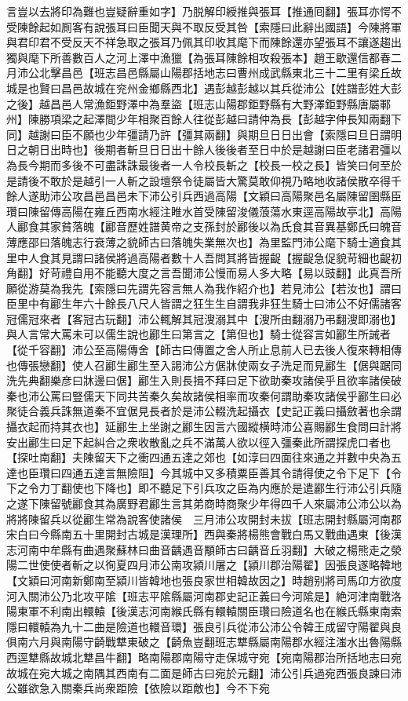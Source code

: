 言豈以去將印為難也豈疑辭重如字】乃脱解印綬推與張耳【推通囘翻】張耳亦愕不受陳餘起如厠客有說張耳曰臣聞天與不取反受其咎【索隱曰此辭出國語】今陳將軍與君印君不受反天不祥急取之張耳乃佩其印收其麾下而陳餘還亦望張耳不讓遂趨出獨與麾下所善數百人之河上澤中漁獵【為張耳陳餘相攻殺張本】趙王歇還信都春二月沛公北擊昌邑【班志昌邑縣屬山陽郡括地志曰曹州成武縣東北三十二里有梁丘故城是也賢曰昌邑故城在兖州金鄉縣西北】遇彭越彭越以其兵從沛公【姓譜彭姓大彭之後】越昌邑人常漁鉅野澤中為羣盜【班志山陽郡鉅野縣有大野澤鉅野縣唐屬鄆州】陳勝項梁之起澤間少年相聚百餘人往從彭越曰請仲為長【彭越字仲長知兩翻下同】越謝曰臣不願也少年彊請乃許【彊其兩翻】與期旦日日出會【索隱曰旦日謂明日之朝日出時也】後期者斬旦日日出十餘人後後者至日中於是越謝曰臣老諸君彊以為長今期而多後不可盡誅誅最後者一人令校長斬之【校長一校之長】皆笑曰何至於是請後不敢於是越引一人斬之設壇祭令徒屬皆大驚莫敢仰視乃略地收諸侯散卒得千餘人遂助沛公攻昌邑昌邑未下沛公引兵西過高陽【文穎曰高陽聚邑名屬陳留圉縣臣瓚曰陳留傳高陽在雍丘西南水經注睢水首受陳留浚儀蒗蕩水東逕高陽故亭北】高陽人酈食其家貧落魄【酈音歷姓譜黄帝之支孫封於酈後以為氏食其音異基鄭氏曰魄音薄應邵曰落魄志行衰薄之貌師古曰落魄失業無次也】為里監門沛公麾下騎士適食其里中人食其見謂曰諸侯將過高陽者數十人吾問其將皆握齪【握齪急促貌苛細也齪初角翻】好苛禮自用不能聽大度之言吾聞沛公慢而易人多大略【易以豉翻】此真吾所願從游莫為我先【索隱曰先謂先容言無人為我作紹介也】若見沛公【若汝也】謂曰臣里中有酈生年六十餘長八尺人皆謂之狂生生自謂我非狂生騎士曰沛公不好儒諸客冠儒冠來者【客冠古玩翻】沛公輒解其冠溲溺其中【溲所由翻溺乃弔翻溲即溺也】與人言常大罵未可以儒生說也酈生曰第言之【第但也】騎士從容言如酈生所誡者【從千容翻】沛公至高陽傳舍【師古曰傳置之舍人所止息前人已去後人復來轉相傳也傳張戀翻】使人召酈生酈生至入謁沛公方倨牀使兩女子洗足而見酈生【倨與踞同洗先典翻樂彦曰牀邊曰倨】酈生入則長揖不拜曰足下欲助秦攻諸侯乎且欲率諸侯破秦也沛公罵曰豎儒天下同共苦秦久矣故諸侯相率而攻秦何謂助秦攻諸侯乎酈生曰必聚徒合義兵誅無道秦不宜倨見長者於是沛公輟洗起攝衣【史記正義曰攝斂著也余謂攝衣起而持其衣也】延酈生上坐謝之酈生因言六國縱横時沛公喜賜酈生食問曰計將安出酈生曰足下起糾合之衆收散亂之兵不滿萬人欲以徑入彊秦此所謂探虎口者也【探吐南翻】夫陳留天下之衝四通五達之郊也【如淳曰四面往來通之并數中央為五達也臣瓚曰四通五達言無險阻】今其城中又多積粟臣善其令請得使之令下足下【令下之令力丁翻使也下降也】即不聽足下引兵攻之臣為内應於是遣酈生行沛公引兵隨之遂下陳留號酈食其為廣野君酈生言其弟商時商聚少年得四千人來屬沛公沛公以為將將陳留兵以從酈生常為說客使諸侯　三月沛公攻開封未拔【班志開封縣屬河南郡宋白曰今縣南五十里開封古城是漢理所】西與秦將楊熊會戰白馬又戰曲遇東【後漢志河南中牟縣有曲遇聚蘇林曰曲音齲遇音顒師古曰齲音丘羽翻】大破之楊熊走之滎陽二世使使者斬之以徇夏四月沛公南攻潁川屠之【潁川郡治陽翟】因張良遂略韓地【文穎曰河南新鄭南至潁川皆韓地也張良家世相韓故因之】時趙别將司馬卬方欲度河入關沛公乃北攻平隂【班志平隂縣屬河南郡史記正義曰今河隂是】絶河津南戰洛陽東軍不利南出轘轅【後漢志河南緱氏縣有轘轅關臣瓚曰險道名也在緱氏縣東南索隱曰轘轅為九十二曲是險道也轘音環】張良引兵從沛公沛公令韓王成留守陽翟與良俱南六月與南陽守齮戰犨東破之【齮魚豈翻班志犨縣屬南陽郡水經注滍水出魯陽縣西逕犨縣故城北犨昌牛翻】略南陽郡南陽守走保城守宛【宛南陽郡治所括地志曰宛故城在宛大城之南隅其西南有二面是師古曰宛於元翻】沛公引兵過宛西張良諫曰沛公雖欲急入關秦兵尚衆距險【依險以距敵也】今不下宛